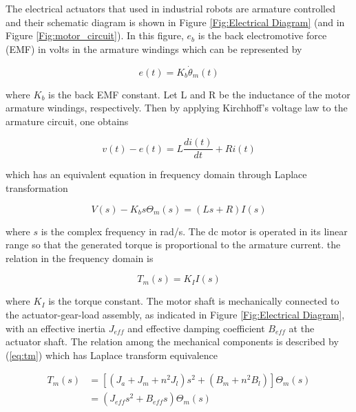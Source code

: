 The electrical actuators that used in industrial robots are armature controlled and their schematic diagram is shown in Figure \ref{Fig:Electrical Diagram} (and in Figure \ref{Fig:motor_circuit}). In this figure, $e_b$ is the back electromotive force (EMF) in volts in the armature windings which can be represented by

\begin{equation} \label{eq:emf}
	e(t) = K_b \dot{\theta}_m(t)
\end{equation}

\noindent where $K_b$ is the back EMF constant. Let L and R be the inductance of the motor armature windings, respectively. Then by applying Kirchhoff's voltage law to the armature circuit, one obtains

\begin{equation} \label{eq:Kirchhof1}
	v(t) - e(t) = L \frac{di(t)}{dt} + R i(t)
\end{equation}

\noindent which has an equivalent equation in frequency domain through Laplace transformation

\begin{equation} \label{eq:Kirchhof1_Laplace}
	V(s) - K_b s \Theta_m(s) = (Ls + R) I(s)
\end{equation}

\noindent where $s$ is the complex frequency in rad/s. The dc motor is operated in its linear range so that the generated torque is proportional to the armature current. the relation in the frequency domain is

\begin{equation} \label{eq:Tm}
	T_m(s) = K_I I(s)
\end{equation}

\noindent where $K_I$ is the torque constant. The motor shaft is mechanically connected to the actuator-gear-load assembly, as indicated in Figure \ref{Fig:Electrical Diagram}, with an effective inertia $J_{eff}$ and effective damping coefficient $B_{eff}$ at the actuator shaft. The relation among the mechanical components is described by (\ref{eq:tm}) which has Laplace transform equivalence

\begin{equation} \label{eq:Tm_Laplace}
	\begin{split}
		T_m(s) &= \left[ \left( J_a + J_m + n^2 J_l \right)s^2 + \left(B_m + n^2 B_l 				\right) \right] \Theta_m(s)\\
			   &= \left(J_{eff} s^2 + B_{eff} s \right) \Theta_m (s)
	\end{split}
\end{equation}

